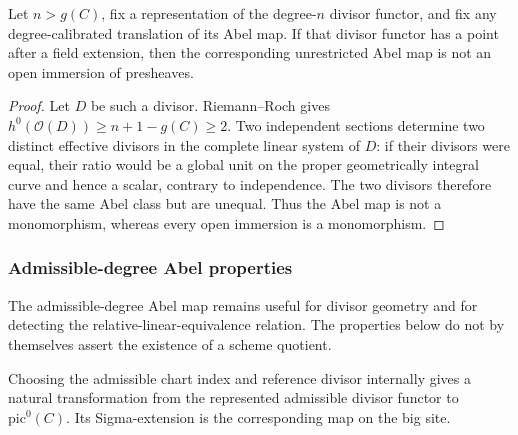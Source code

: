 \begin{theorem}
  \label{thm:highDegreeAbel_notOpenImmersion}
  \leanok
  Let \(n>g(C)\), fix a representation of the degree-\(n\) divisor functor, and fix any
  degree-calibrated translation of its Abel map.  If that divisor functor has a point after a
  field extension, then the corresponding unrestricted Abel map is not an open immersion of
  presheaves.
\end{theorem}
\begin{proof}
  Let \(D\) be such a divisor.  Riemann--Roch gives
  \(h^0(\mathcal O(D))\ge n+1-g(C)\ge2\).  Two independent sections determine two distinct
  effective divisors in the complete linear system of \(D\): if their divisors were equal,
  their ratio would be a global unit on the proper geometrically integral curve and hence a
  scalar, contrary to independence.  The two divisors therefore have the same Abel class but
  are unequal.  Thus the Abel map is not a monomorphism, whereas every open immersion is a
  monomorphism.
\end{proof}

\subsubsection{Admissible-degree Abel properties}

The admissible-degree Abel map remains useful for divisor geometry and for detecting the
relative-linear-equivalence relation.  The properties below do not by themselves assert the
existence of a scheme quotient.

\begin{definition}
  \label{def:admissibleAbelMap}
  \leanok
  Choosing the admissible chart index and reference divisor internally gives a natural
  transformation from the represented admissible divisor functor to
  \(\mathrm{pic}^0(C)\).  Its Sigma-extension is the corresponding map on the big site.
\end{definition}

